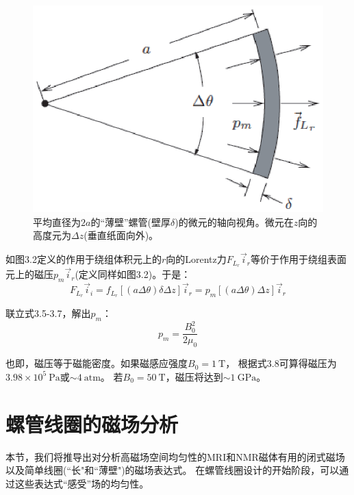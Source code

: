 \begin{figure}[htbp]
  \centering
 \includegraphics[scale=0.6]{chpt3/figs/fig3.2.eps}
  \caption{平均直径为$2a$的``薄壁''螺管(壁厚$\delta$)的微元的轴向视角。微元在$z$向的高度元为$\Delta z$(垂直纸面向外)。}
\end{figure}

如图3.2定义的作用于绕组体积元上的$r$向的Lorentz力$F_{L_r}\vec{i}_r$等价于作用于绕组表面元上的磁压$p_m\vec{i}_r$(定义同样如图3.2)。于是：
\begin{equation}\label{eqn:inf solenoid fl2}
  F_{L_r}\vec{i}_i =f_{L_r}[(a\Delta \theta)\delta \Delta z]\vec{i}_r=p_m[(a\Delta \theta)\Delta z]\vec{i}_r
\end{equation}

联立式3.5-3.7，解出$p_m$：
\begin{equation}\label{eqn:mag press}
  p_m=\frac{B_0^2}{2\mu_0}
\end{equation}

也即，磁压等于磁能密度。如果磁感应强度$B_0=1\ \mathrm{T}$，
根据式3.8可算得磁压为$3.98\times 10^5 \ \mathrm{Pa}$或$\sim 4\ \mathrm{atm}$。
若$B_0=50 \ \mathrm{T}$，磁压将达到$\sim 1\ \mathrm{GPa}$。

\section{螺管线圈的磁场分析}
本节，我们将推导出对分析高磁场空间均匀性的MRI和NMR磁体有用的闭式磁场
以及简单线圈(``长"和``薄壁")的磁场表达式。
在螺管线圈设计的开始阶段，可以通过这些表达式``感受''场的均匀性。

